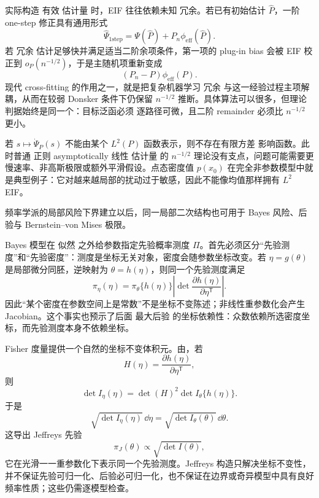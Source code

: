 \begin{note}[一步修正与二阶余项]
实际构造 有效 估计量 时，EIF 往往依赖未知 冗余。若已有初始估计 $\widehat P$，一阶 one-step 修正具有通用形式
\begin{equation*}{
\widehat\Psi_{\mathrm{1step}}
=
\Psi(\widehat P)
+P_n\phi_{\mathrm{eff}}(\widehat P)
}.\end{equation*}
若 冗余 估计足够快并满足适当二阶余项条件，第一项的 plug-in bias 会被 EIF 校正到 $o_P(n^{-1/2})$，于是主随机项重新变成
\[
(P_n-P)\phi_{\mathrm{eff}}(P).
\]
现代 cross-fitting 的作用之一，就是把复杂机器学习 冗余 与这一经验过程主项解耦，从而在较弱 Donsker 条件下仍保留 $n^{-1/2}$ 推断。具体算法可以很多，但理论判据始终是同一个：目标泛函必须 逐路径可微，且二阶 remainder 必须比 $n^{-1/2}$ 更小。
\end{note}

\begin{note}
若 $s\mapsto\dot\Psi_P(s)$ 不能由某个 $L^2(P)$ 函数表示，则不存在有限方差 影响函数。此时普通 正则 asymptotically 线性 估计量 的 $n^{-1/2}$ 理论没有支点，问题可能需要更慢速率、非高斯极限或额外平滑假设。点态密度值 $p(x_0)$ 在完全非参数模型中就是典型例子：它对越来越局部的扰动过于敏感，因此不能像均值那样拥有 $L^2$ EIF。
\end{note}

频率学派的局部风险下界建立以后，同一局部二次结构也可用于 Bayes 风险、后验与 Bernstein--von Mises 极限。

\begin{definition}[先验测度与坐标密度]
Bayes 模型在 似然 之外给参数指定先验概率测度 $\Pi$。首先必须区分“先验测度”和“先验密度”：测度是坐标无关对象，密度会随参数坐标改变。若 $\eta=g(\theta)$ 是局部微分同胚，逆映射为 $\theta=h(\eta)$，则同一个先验测度满足
\begin{equation*}\pi_\eta(\eta)
 =\pi_\theta\{h(\eta)\}
 \left|\det\frac{\partial h(\eta)}{\partial\eta^{\mathsf T}}\right|.
\end{equation*}
因此“某个密度在参数空间上是常数”不是坐标不变陈述；非线性重参数化会产生 Jacobian。这个事实也预示了后面 最大后验 的坐标依赖性：众数依赖所选密度坐标，而先验测度本身不依赖坐标。
\end{definition}

\begin{proposition}
Fisher 度量提供一个自然的坐标不变体积元。由，若
\[
 H(\eta)=\frac{\partial h(\eta)}{\partial\eta^{\mathsf T}},
\]
则
\[
 \det I_\eta(\eta)
 =\det(H)^2\det I_\theta\{h(\eta)\}.
\]
于是
\begin{equation*}\sqrt{\det I_\eta(\eta)}\,\dd\eta
 =\sqrt{\det I_\theta(\theta)}\,\dd\theta.
\end{equation*}
这导出 Jeffreys 先验
\begin{equation*}\pi_J(\theta)\propto\sqrt{\det I(\theta)},
\end{equation*}
它在光滑一一重参数化下表示同一个先验测度。Jeffreys 构造只解决坐标不变性，并不保证先验可归一化、后验必可归一化，也不保证在边界或奇异模型中具有良好频率性质；这些仍需逐模型检查。
\end{proposition}

